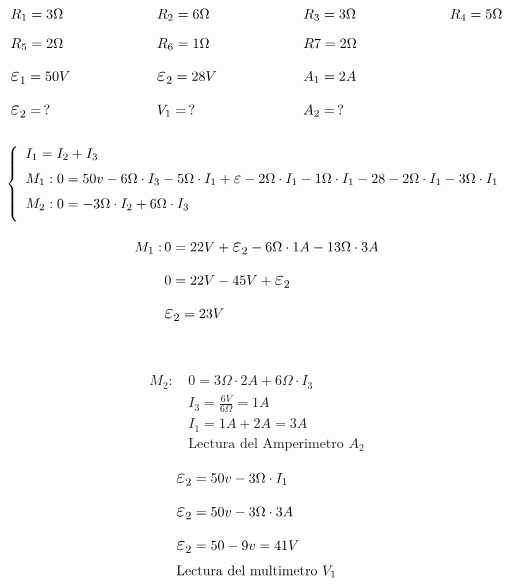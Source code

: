 \documentclass[12pt]{report}
\newcommand {\LEpsilon}{\mathlarger{\mathlarger{\varepsilon}}}
\begin{document}
$$
\begin{aligned}
    &R_1=3\Omega \hspace{2cm} && R_2=6\Omega \hspace{2cm} && R_3=3\Omega \hspace{2cm} && R_4=5\Omega\\[6pt]
    &R_5=2\Omega  &&R_6=1\Omega && R7=2\Omega\\[6pt]
    &\LEpsilon_1=50V &&\LEpsilon_2=28V  &&A_1=2A \\[6pt]
    &\LEpsilon_2=\,? &&V_1=\,? &&A_2=\,?\\[12pt]
\end{aligned}
$$
\vspace{-0.2cm}
$$
\left\{
\begin{array}{l}
\text{$I_1= I_2+I_3$} \\[6pt]
\text{$M_1: 0=50v-6\Omega \cdot I_3 - 5\Omega \cdot I_1+\LEpsilon -2\Omega \cdot I_1-1\Omega \cdot I_1-28-2\Omega \cdot I_1 -3\Omega \cdot I_1$} \\[6pt]
\text{$M_2: 0=-3\Omega \cdot I_2 +6\Omega \cdot I_3$}\\[6pt]
\end{array}
\right.
$$
\vspace{-0.5cm}
\begin{figure}[h]
 \begin{minipage}{0.4\textwidth}
  \centering
    $$
    \begin{aligned}
      M_1:\,&0=22V + \LEpsilon_2 -6\Omega \cdot 1A - 13\Omega \cdot 3A\\[6pt]
      &0=22V -45V + \LEpsilon_2\\[6pt]
      &\LEpsilon_2 = 23V\\[6pt]
      &\phantom{culo}
    \end{aligned}
    $$
  \end{minipage}\hfill
  \begin{minipage}{0.4\textwidth}
    \centering
    $$
    \begin{aligned}
      M_2:\,&0=3\Omega \cdot 2A + 6\Omega \cdot I_3\\[6pt]
      &I_3=\frac{6V}{6\Omega}=1A \\[6pt]
      &I_1=1A+2A=3A\\[8pt]
      & \text{Lectura del Amperimetro } A_2
    \end{aligned}
    $$
  \end{minipage}\hfill
\end{figure}


$$
\begin{aligned}
  &\LEpsilon_2=50v-3\Omega \cdot I_1\\[6pt]
  &\LEpsilon_2=50v -3\Omega \cdot 3A\\[6pt]
  &\LEpsilon_2=50-9v=41V\\
  &\text{Lectura del multimetro $V_1$}
\end{aligned}
$$
\end{document}
